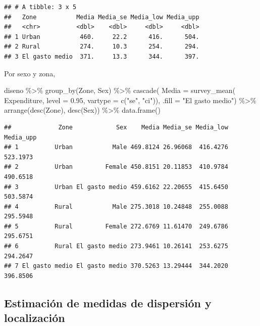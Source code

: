 \documentclass[
  12pt,
]{book}
\newenvironment{Shaded}{\begin{snugshade}}{\end{snugshade}}
\newcommand{\AttributeTok}[1]{\textcolor[rgb]{0.77,0.63,0.00}{#1}}
\newcommand{\FloatTok}[1]{\textcolor[rgb]{0.00,0.00,0.81}{#1}}
\newcommand{\FunctionTok}[1]{\textcolor[rgb]{0.00,0.00,0.00}{#1}}
\newcommand{\NormalTok}[1]{#1}
\newcommand{\SpecialCharTok}[1]{\textcolor[rgb]{0.00,0.00,0.00}{#1}}
\newcommand{\StringTok}[1]{\textcolor[rgb]{0.31,0.60,0.02}{#1}}
\begin{document}
\begin{verbatim}
## # A tibble: 3 x 5
##   Zone           Media Media_se Media_low Media_upp
##   <chr>          <dbl>    <dbl>     <dbl>     <dbl>
## 1 Urban           460.     22.2      416.      504.
## 2 Rural           274.     10.3      254.      294.
## 3 El gasto medio  371.     13.3      344.      397.
\end{verbatim}

Por sexo y zona,

\begin{Shaded}
\begin{Highlighting}[]
\NormalTok{diseno }\SpecialCharTok{\%\textgreater{}\%} \FunctionTok{group\_by}\NormalTok{(Zone, Sex) }\SpecialCharTok{\%\textgreater{}\%}
  \FunctionTok{cascade}\NormalTok{(}
    \AttributeTok{Media =} \FunctionTok{survey\_mean}\NormalTok{(}
\NormalTok{      Expenditure, }\AttributeTok{level =} \FloatTok{0.95}\NormalTok{,}
       \AttributeTok{vartype =}  \FunctionTok{c}\NormalTok{(}\StringTok{"se"}\NormalTok{, }\StringTok{"ci"}\NormalTok{)),}
        \AttributeTok{.fill =} \StringTok{"El gasto medio"}\NormalTok{) }\SpecialCharTok{\%\textgreater{}\%}
  \FunctionTok{arrange}\NormalTok{(}\FunctionTok{desc}\NormalTok{(Zone), }\FunctionTok{desc}\NormalTok{(Sex)) }\SpecialCharTok{\%\textgreater{}\%}
  \FunctionTok{data.frame}\NormalTok{()}
\end{Highlighting}
\end{Shaded}

\begin{verbatim}
##             Zone            Sex    Media Media_se Media_low Media_upp
## 1          Urban           Male 469.8124 26.96068  416.4276  523.1973
## 2          Urban         Female 450.8151 20.11853  410.9784  490.6518
## 3          Urban El gasto medio 459.6162 22.20655  415.6450  503.5874
## 4          Rural           Male 275.3018 10.24848  255.0088  295.5948
## 5          Rural         Female 272.6769 11.61470  249.6786  295.6751
## 6          Rural El gasto medio 273.9461 10.26141  253.6275  294.2647
## 7 El gasto medio El gasto medio 370.5263 13.29444  344.2020  396.8506
\end{verbatim}

\hypertarget{estimaciuxf3n-de-medidas-de-dispersiuxf3n-y-localizaciuxf3n}{%
\subsection{Estimación de medidas de dispersión y localización}\label{estimaciuxf3n-de-medidas-de-dispersiuxf3n-y-localizaciuxf3n}}
\end{document}
